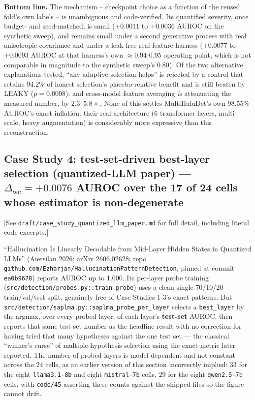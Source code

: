 \documentclass[10pt]{article} %
\begin{document}
\textbf{Bottom line.} The mechanism -- checkpoint choice as a function of the
reused fold's own labels -- is unambiguous and code-verified. Its quantified
severity, once budget- and seed-matched, is small ($+0.0011$ to $+0.0036$ AUROC
on the synthetic sweep), and remains small under a second generative process
with real anisotropic covariance and under a leak-free real-feature harness
($+0.0077$ to $+0.0093$ AUROC at that harness's own $\approx0.94$-$0.95$
operating point, which is not comparable in magnitude to the synthetic sweep's
$0.80$). Of the two alternative explanations tested, ``any adaptive selection
helps'' is rejected by a control that retains $94.2\%$ of honest selection's
placebo-relative benefit and is still beaten by LEAKY ($p=0.0008$); and
cross-model feature averaging \emph{is} attenuating the measured number, by
$2.3$--$5.8\times$. None of this settles MultiHaluDet's own 98.55\% AUROC's
exact inflation: their real architecture (6 transformer layers, multi-scale,
heavy augmentation) is considerably more expressive than this reconstruction.

\subsection{Case Study 4: test-set-driven best-layer selection (quantized-LLM paper) --- $\Delta_{\text{wc}}=+0.0076$ AUROC over the 17 of 24 cells whose estimator is non-degenerate}

[See \texttt{draft/case\_study\_quantized\_llm\_paper.md} for full detail, including
literal code excerpts.]

``Hallucination Is Linearly Decodable from Mid-Layer Hidden States in
Quantized LLMs'' (Aiersilan 2026; arXiv 2606.02628; repo
\texttt{github.com/Ezharjan/HallucinationPatternDetection}, pinned at commit
\texttt{ea0b9678}) reports AUROC up to 1.000. Its per-layer probe training
(\texttt{src/detection/probes.py::train\_probe}) uses a clean single 70/10/20
train/val/test split, genuinely free of Case Studies 1-3's exact patterns. But
\texttt{src/detection/saplma.py::saplma\_probe\_per\_layer} selects a
\texttt{best\_layer} by the argmax, over every probed layer, of each layer's
\textbf{test-set} AUROC, then reports that same test-set number as the headline
result with no correction for having tried that many hypotheses against the one
test set --- the classical ``winner's curse'' of multiple-hypothesis selection
using the exact metric later reported. The number of probed layers is
model-dependent and not constant across the 24 cells, as an earlier version of
this section incorrectly implied: $33$ for the eight \texttt{llama3.1-8b} and
eight \texttt{mistral-7b} cells, $29$ for the eight \texttt{qwen2.5-7b} cells,
with \texttt{code/45} asserting these counts against the shipped files so the
figure cannot drift.
\end{document}
